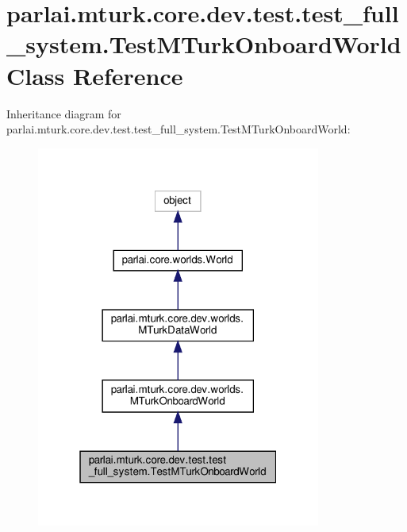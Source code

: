 \hypertarget{classparlai_1_1mturk_1_1core_1_1dev_1_1test_1_1test__full__system_1_1TestMTurkOnboardWorld}{}\section{parlai.\+mturk.\+core.\+dev.\+test.\+test\+\_\+full\+\_\+system.\+Test\+M\+Turk\+Onboard\+World Class Reference}
\label{classparlai_1_1mturk_1_1core_1_1dev_1_1test_1_1test__full__system_1_1TestMTurkOnboardWorld}


Inheritance diagram for parlai.\+mturk.\+core.\+dev.\+test.\+test\+\_\+full\+\_\+system.\+Test\+M\+Turk\+Onboard\+World\+:
\nopagebreak
\begin{figure}[H]
\begin{center}
\leavevmode
\includegraphics[width=265pt]{dc/deb/classparlai_1_1mturk_1_1core_1_1dev_1_1test_1_1test__full__system_1_1TestMTurkOnboardWorld__inherit__graph}
\end{center}
\end{figure}


